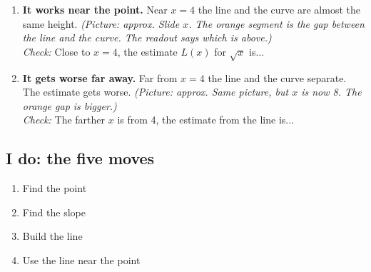 \documentclass[11pt]{article}
\begin{document}
\begin{enumerate}
\item \textbf{It works near the point.} Near $x=4$ the line and the curve are almost the same height. \textit{(Picture: approx. Slide $x$. The orange segment is the gap between the line and the curve. The readout says which is above.)}\\ \textit{Check:} Close to $x=4$, the estimate $L(x)$ for $\sqrt{x}$ is... 
\item \textbf{It gets worse far away.} Far from $x=4$ the line and the curve separate. The estimate gets worse. \textit{(Picture: approx. Same picture, but $x$ is now 8. The orange gap is bigger.)}\\ \textit{Check:} The farther $x$ is from 4, the estimate from the line is... 
\end{enumerate}
\subsection*{I do: the five moves}\begin{enumerate}\item Find the point
\item Find the slope
\item Build the line
\item Use the line near the point\end{enumerate}
\end{document}
